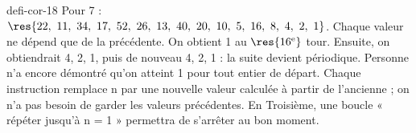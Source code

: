 \begin{blocEdition}{defi-cor-18}
Pour 7 : $\res{22,\ 11,\ 34,\ 17,\ 52,\ 26,\ 13,\ 40,\ 20,\ 10,\ 5,\ 16,\ 8,\ 4,\ 2,\ 1}$. Chaque valeur ne dépend que de la précédente.
On obtient 1 au $\res{16^\text{e}}$ tour. Ensuite, on obtiendrait 4, 2, 1, puis de nouveau 4, 2, 1 : la suite devient périodique. Personne n’a encore démontré qu’on atteint 1 pour tout entier de départ.
Chaque instruction remplace n par une nouvelle valeur calculée à partir de l’ancienne ; on n’a pas besoin de garder les valeurs précédentes. En Troisième, une boucle « répéter jusqu’à n = 1 » permettra de s’arrêter au bon moment.\label{fig-defi-cor-18}

\end{blocEdition}
